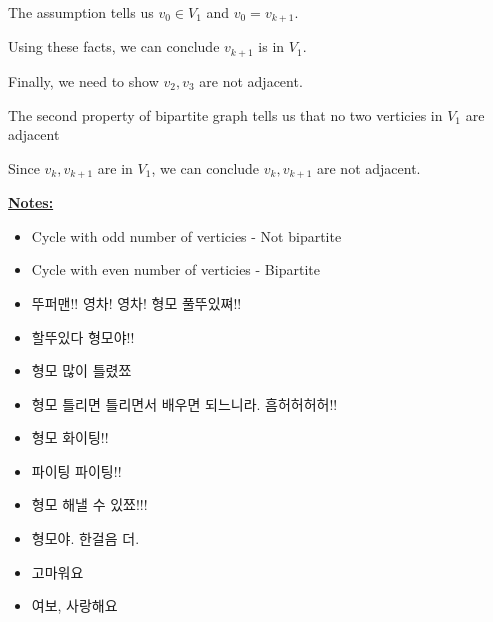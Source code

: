 \documentclass[12pt]{article}
\begin{document}
\begin{enumerate}[a.]
\begin{mdframed}
\begin{enumerate}[1.]
\begin{mdframed}
                \bigskip

                The assumption tells us $v_0 \in V_1$ and $v_0 = v_{k+1}$.

                \bigskip

                Using these facts, we can conclude $v_{k+1}$ is in $V_1$.

                \bigskip

                Finally, we need to show $v_2, v_3$ are not adjacent.

                \bigskip

                The second property of bipartite graph tells us that no two
                verticies in $V_1$ are adjacent

                \bigskip

                Since $v_k,v_{k+1}$ are in $V_1$, we can conclude $v_k,v_{k+1}$ are not
                adjacent.

            \end{mdframed}
        \end{enumerate}
    \end{mdframed}

    \underline{\textbf{Notes:}}

    \begin{itemize}
        \item Cycle with odd number of verticies - Not bipartite


        \item Cycle with even number of verticies - Bipartite


        \item 뚜퍼맨!! 영차! 영차! 형모 풀뚜있쪄!!
        \item 할뚜있다 형모야!!
        \item 형모 많이 틀렸쬬
        \item 형모 틀리면 틀리면서 배우면 되느니라. 흠허허허허!!
        \item 형모 화이팅!!
        \item 파이팅 파이팅!!
        \item 형모 해낼 수 있쬬!!!
        \item 형모야. 한걸음 더.
        \item 고마워요
        \item 여보, 사랑해요

    \end{itemize}

\end{enumerate}
\end{document}
